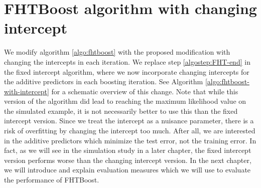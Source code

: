 \section{FHTBoost algorithm with changing intercept}\label{subsec:FHT-intercept}
We modify algorithm \ref{algo:fhtboost} with the proposed modification with changing the intercepts in each iteration.
We replace step \ref{algostep:FHT-end} in the fixed intercept algorithm, where we now incorporate changing intercepts for the additive predictors in each boosting iteration.
See Algorithm \ref{algo:fhtboost-with-intercept} for a schematic overview of this change.
Note that while this version of the algorithm did lead to reaching the maximum likelihood value on the simulated example, it is not necessarily better to use this than the fixed intercept version.
Since we treat the intercept as a nuisance parameter, there is a risk of overfitting by changing the intercept too much.
After all, we are interested in the additive predictors which minimize the test error, not the training error.
In fact, as we will see in the simulation study in a later chapter, the fixed intercept version performs worse than the changing intercept version.
In the next chapter, we will introduce and explain evaluation measures which we will use to evaluate the performance of FHTBoost.

